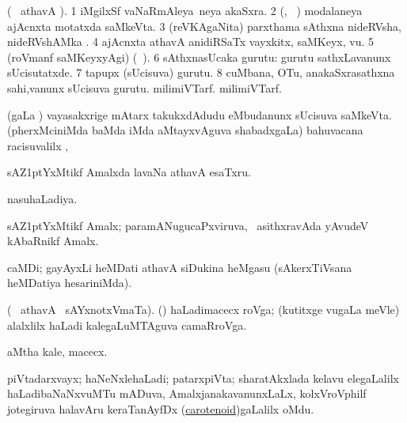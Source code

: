 \bentry 
{}  
\gl{\nA} 
\bmng
(\bava\  athavA ). 
\bnum
\num{1} iMgilxSf vaNaRmAleya \,neya akaSxra. 
\num{2} (\biVga, \sA\ ) modalaneya ajAcnxta motatxda saMkeVta. 
\num{3} (reVKAgaNita) parxthama sAthxna nideRVsha, nideRVshAMka .  
\num{4} ajAcnxta athavA anidiRSaTx vayxkitx, saMKeyx, \mo vu. 
\num{5} (roVmanf saMKeyxyAgi)  (\udA\ ).   
\num{6} sAthxnasUcaka gurutu:   \; gurutu sathxLavanunx sUcisutatxde. 
\num{7} tapupx (sUcisuva) gurutu. 
\num{8} cuMbana, OTu, anakaSxrasathxna sahi,\mo vanunx sUcisuva gurutu.  milimiVTarf.  milimiVTarf.
\enum
\emng
\eentry

\bentry
{} 
\gl{\saMkeV} 
\bmng
(\caci gaLa \vi) vayasakxrige mAtarx takukxdAdudu eMbudanunx  sUcisuva saMkeVta.
\emng
\eentry
\bentry
{} 
\gl{\uparx} 
\bmng
(pherxMciniMda baMda  iMda  aMtayxvAguva shabadxgaLa) bahuvacana racisuvalilx \parx, \udA\  
\emng 
\eentry

\bentry
{} 
\gl{\nA} 
\bmng
sAZ\kern1ptYxMtikf Amalxda lavaNa athavA esaTxru.
\emng
\eentry

\bentry
{} 
\gl{\gu} 
\bmng
nasuhaLadiya.
\emng  
\eentry

\bentry
{} 
\gl{\nA} 
\bmng
sAZ\kern1ptYxMtikf Amalx;  paramANugucaPxviruva, \sA\  asithxravAda yAvudeV kAbaRnikf Amalx.
\emng
\eentry

\bentry
{} 
\gl{\nA}
\bmng
caMDi; gayAyxLi heMDati athavA siDukina heMgasu (sAkerxTiVsana heMDatiya hesariniMda).
\emng
\eentry

\bentry
{}
\gl{\nA} 
\bmng
(\bava\  athavA  \ucAcx\ sAYxnotxVmaTa). ({\roVshA})
\banum
{}  haLadimacecx roVga; (kutitxge \mo vugaLa meVle) alalxlilx haLadi kalegaLuMTAguva camaRroVga.
 
 aMtha kale, macecx.
\eanum
\emng
\eentry

\bentry
{} 
\gl{\nA}
\bmng
piVtadarxvayx; haNeNxlehaLadi; patarxpiVta; sharatAkxlada kelavu elegaLalilx  haLadibaNaNxvuMTu mADuva,  AmalxjanakavanunxLaLx, kolxVroVphilf jotegiruva halavAru keraTanAyfDx (\hyperref{kandict_c.pdf}{C}{carotenoid}{carotenoid})gaLalilx oMdu.
\emng  
\eentry

